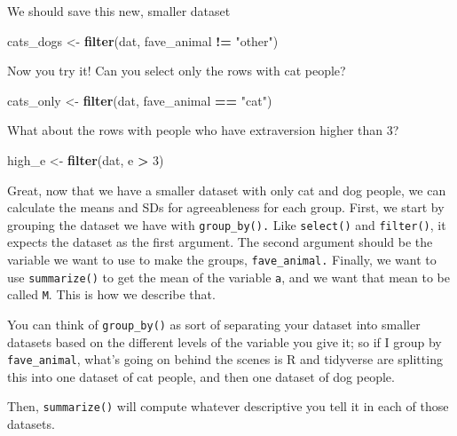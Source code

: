 \documentclass[
]{article}
\newenvironment{Shaded}{\begin{snugshade}}{\end{snugshade}}
\newcommand{\DecValTok}[1]{\textcolor[rgb]{0.00,0.00,0.81}{#1}}
\newcommand{\FunctionTok}[1]{\textcolor[rgb]{0.13,0.29,0.53}{\textbf{#1}}}
\newcommand{\NormalTok}[1]{#1}
\newcommand{\OtherTok}[1]{\textcolor[rgb]{0.56,0.35,0.01}{#1}}
\newcommand{\SpecialCharTok}[1]{\textcolor[rgb]{0.81,0.36,0.00}{\textbf{#1}}}
\newcommand{\StringTok}[1]{\textcolor[rgb]{0.31,0.60,0.02}{#1}}
\begin{document}
We should save this new, smaller dataset

\begin{Shaded}
\begin{Highlighting}[]
\NormalTok{cats\_dogs }\OtherTok{\textless{}{-}} \FunctionTok{filter}\NormalTok{(dat, fave\_animal }\SpecialCharTok{!=} \StringTok{"other"}\NormalTok{)}
\end{Highlighting}
\end{Shaded}

Now you try it! Can you select only the rows with cat people?

\begin{Shaded}
\begin{Highlighting}[]
\NormalTok{cats\_only }\OtherTok{\textless{}{-}} \FunctionTok{filter}\NormalTok{(dat, fave\_animal }\SpecialCharTok{==} \StringTok{"cat"}\NormalTok{)}
\end{Highlighting}
\end{Shaded}

What about the rows with people who have extraversion higher than 3?

\begin{Shaded}
\begin{Highlighting}[]
\NormalTok{high\_e }\OtherTok{\textless{}{-}} \FunctionTok{filter}\NormalTok{(dat, e }\SpecialCharTok{\textgreater{}} \DecValTok{3}\NormalTok{)}
\end{Highlighting}
\end{Shaded}

Great, now that we have a smaller dataset with only cat and dog people,
we can calculate the means and SDs for agreeableness for each group.
First, we start by grouping the dataset we have with
\texttt{group\_by().} Like \texttt{select()} and \texttt{filter()}, it
expects the dataset as the first argument. The second argument should be
the variable we want to use to make the groups, \texttt{fave\_animal.}
Finally, we want to use \texttt{summarize()} to get the mean of the
variable \texttt{a}, and we want that mean to be called \texttt{M}. This
is how we describe that.

You can think of \texttt{group\_by()} as sort of separating your dataset
into smaller datasets based on the different levels of the variable you
give it; so if I group by \texttt{fave\_animal}, what's going on behind
the scenes is R and tidyverse are splitting this into one dataset of cat
people, and then one dataset of dog people.

Then, \texttt{summarize()} will compute whatever descriptive you tell it
in each of those datasets.
\end{document}
